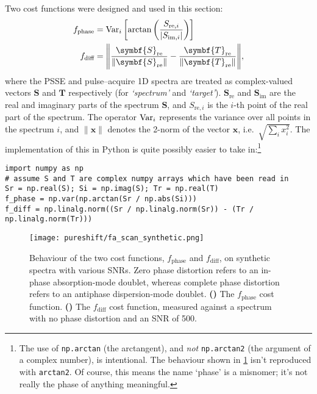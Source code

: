 Two cost functions were designed and used in this section:
\begin{align}
    f_\text{phase} &= \Var_i\left[\arctan\left(\frac{S_{\text{re},i}}{|S_{\text{im},i}|}\right)\right] \label{eq:ps_cf_phase} \\
    f_\text{diff} &= \Biggl\lVert \frac{\symbf{S}_\text{re}}{\lVert \symbf{S}_\text{re} \rVert} - \frac{\symbf{T}_\text{re}}{\lVert \symbf{T}_\text{re} \rVert} \Biggr\rVert, \label{eq:ps_cf_diff}
\end{align}
where the PSSE and pulse--acquire 1D spectra are treated as complex-valued vectors $\symbf{S}$ and $\symbf{T}$ respectively (for \textit{`spectrum'} and \textit{`target'}). $\symbf{S}_\text{re}$ and $\symbf{S}_\text{im}$ are the real and imaginary parts of the spectrum $\symbf{S}$, and $S_{\text{re},i}$ is the $i$-th point of the real part of the spectrum.
The operator $\operatorname{Var}_i$ represents the variance over all points in the spectrum $i$, and $\lVert \symbf{x} \rVert$ denotes the 2-norm of the vector $\symbf{x}$, i.e.\ $\sqrt{\sum_i x_i^2}$.
The implementation of this in Python is quite possibly easier to take in:\footnote{The use of \texttt{np.arctan} (the arctangent), and \textit{not} \texttt{np.arctan2} (the argument of a complex number), is intentional. The behaviour shown in \cref{fig:fa_scan_synthetic} isn't reproduced with \texttt{arctan2}. Of course, this means the name `phase' is a misnomer; it's not really the phase of anything meaningful.}
\begin{verbatim}
import numpy as np
# assume S and T are complex numpy arrays which have been read in
Sr = np.real(S); Si = np.imag(S); Tr = np.real(T)
f_phase = np.var(np.arctan(Sr / np.abs(Si)))
f_diff = np.linalg.norm((Sr / np.linalg.norm(Sr)) - (Tr / np.linalg.norm(Tr)))
\end{verbatim}

\begin{figure}[htb]
    \centering
    \texttt{[image: pureshift/fa\_scan\_synthetic.png]}
    {\label{fig:fa_scan_synthetic_fphase}}
    {\label{fig:fa_scan_synthetic_fdiff}}
    \caption[Evaluation of $f_\text{phase}$ and $f_\text{diff}$ cost functions on synthetic data]{
        Behaviour of the two cost functions, $f_\text{phase}$ and $f_\text{diff}$, on synthetic spectra with various SNRs.
        Zero phase distortion refers to an in-phase absorption-mode doublet, whereas complete phase distortion refers to an antiphase dispersion-mode doublet.
        \textbf{()} The $f_\text{phase}$ cost function.
        \textbf{()} The $f_\text{diff}$ cost function, measured against a spectrum with no phase distortion and an SNR of 500.
    }
    \label{fig:fa_scan_synthetic}
\end{figure}

